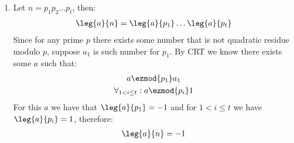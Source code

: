 \begin{enumerate}[label=\ilabel]
    \item
        Let $n = p_1 p_2 \dots p_t$, then:
        \begin{gather*}
            \leg{a}{n} = \leg{a}{p_1} \dots \leg{a}{p_t}
        \end{gather*}
        Since for any prime $p$ there exists some number that is not quadratic residue modulo $p$, suppose $a_1$ is such number for $p_1$.
        By CRT we know there exists some $a$ such that:
        \begin{gather*}
            a \ezmod{p_1} a_1 \\
            \forall_{1 < i \le t}: a \ezmod{p_i} 1
        \end{gather*}
        For this $a$ we have that $\leg{a}{p_1} = -1$ and for $1 < i \le t$ we have $\leg{a}{p_i} = 1$, therefore:
        \begin{gather*}
            \leg{a}{n} = -1
        \end{gather*}
\end{enumerate}
